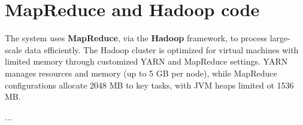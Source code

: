 \section{MapReduce and Hadoop code}
The system uses \textbf{MapReduce}, via the \textbf{Hadoop} framework, to process large-scale data efficiently. The Hadoop cluster is optimized for virtual machines with limited memory through customized YARN and MapReduce settings. YARN manages resources and memory (up to 5 GB per node), while MapReduce configurations allocate 2048 MB to key tasks, with JVM heaps limited ot 1536 MB. 

...

